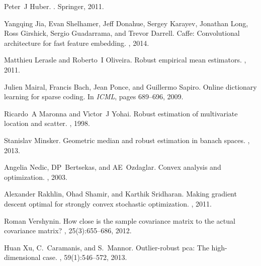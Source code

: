 \documentclass[11pt]{article}
\begin{document}
\begin{thebibliography}{10}
	Peter~J Huber.
	.
	\newblock Springer, 2011.
	
	Yangqing Jia, Evan Shelhamer, Jeff Donahue, Sergey Karayev, Jonathan Long, Ross
	Girshick, Sergio Guadarrama, and Trevor Darrell.
	\newblock Caffe: Convolutional architecture for fast feature embedding.
	, 2014.
	
	Matthieu Lerasle and Roberto~I Oliveira.
	\newblock Robust empirical mean estimators.
	, 2011.
	
	Julien Mairal, Francis Bach, Jean Ponce, and Guillermo Sapiro.
	\newblock Online dictionary learning for sparse coding.
	\newblock In {\em ICML}, pages 689--696, 2009.
	
	Ricardo~A Maronna and V{\'\i}ctor~J Yohai.
	\newblock Robust estimation of multivariate location and scatter.
	, 1998.
	
	Stanislav Minsker.
	\newblock Geometric median and robust estimation in banach spaces.
	, 2013.
	
	Angelia Nedic, DP~Bertsekas, and AE~Ozdaglar.
	\newblock Convex analysis and optimization.
	, 2003.
	
	Alexander Rakhlin, Ohad Shamir, and Karthik Sridharan.
	\newblock Making gradient descent optimal for strongly convex stochastic
	optimization.
	, 2011.
	
	Roman Vershynin.
	\newblock How close is the sample covariance matrix to the actual covariance
	matrix?
	, 25(3):655--686, 2012.
	
	Huan Xu, C.~Caramanis, and S.~Mannor.
	\newblock Outlier-robust pca: The high-dimensional case.
	, 59(1):546--572, 2013.
	
\end{thebibliography}
\end{document}
